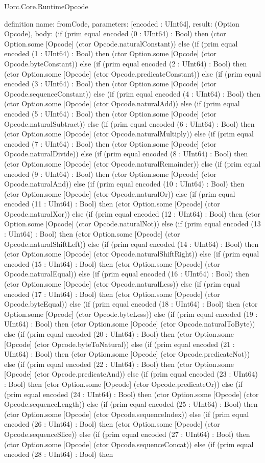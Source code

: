 \begin{lexlean}{Uorc.Core.RuntimeOpcode}
\begin{semanticmodule}
definition{
  name: fromCode,
  parameters: [encoded : UInt64],
  result: (Option Opcode),
  body: (if (prim equal encoded (0 : UInt64) : Bool) then (ctor Option.some [Opcode] (ctor Opcode.naturalConstant)) else (if (prim equal encoded (1 : UInt64) : Bool) then (ctor Option.some [Opcode] (ctor Opcode.byteConstant)) else (if (prim equal encoded (2 : UInt64) : Bool) then (ctor Option.some [Opcode] (ctor Opcode.predicateConstant)) else (if (prim equal encoded (3 : UInt64) : Bool) then (ctor Option.some [Opcode] (ctor Opcode.sequenceConstant)) else (if (prim equal encoded (4 : UInt64) : Bool) then (ctor Option.some [Opcode] (ctor Opcode.naturalAdd)) else (if (prim equal encoded (5 : UInt64) : Bool) then (ctor Option.some [Opcode] (ctor Opcode.naturalSubtract)) else (if (prim equal encoded (6 : UInt64) : Bool) then (ctor Option.some [Opcode] (ctor Opcode.naturalMultiply)) else (if (prim equal encoded (7 : UInt64) : Bool) then (ctor Option.some [Opcode] (ctor Opcode.naturalDivide)) else (if (prim equal encoded (8 : UInt64) : Bool) then (ctor Option.some [Opcode] (ctor Opcode.naturalRemainder)) else (if (prim equal encoded (9 : UInt64) : Bool) then (ctor Option.some [Opcode] (ctor Opcode.naturalAnd)) else (if (prim equal encoded (10 : UInt64) : Bool) then (ctor Option.some [Opcode] (ctor Opcode.naturalOr)) else (if (prim equal encoded (11 : UInt64) : Bool) then (ctor Option.some [Opcode] (ctor Opcode.naturalXor)) else (if (prim equal encoded (12 : UInt64) : Bool) then (ctor Option.some [Opcode] (ctor Opcode.naturalNot)) else (if (prim equal encoded (13 : UInt64) : Bool) then (ctor Option.some [Opcode] (ctor Opcode.naturalShiftLeft)) else (if (prim equal encoded (14 : UInt64) : Bool) then (ctor Option.some [Opcode] (ctor Opcode.naturalShiftRight)) else (if (prim equal encoded (15 : UInt64) : Bool) then (ctor Option.some [Opcode] (ctor Opcode.naturalEqual)) else (if (prim equal encoded (16 : UInt64) : Bool) then (ctor Option.some [Opcode] (ctor Opcode.naturalLess)) else (if (prim equal encoded (17 : UInt64) : Bool) then (ctor Option.some [Opcode] (ctor Opcode.byteEqual)) else (if (prim equal encoded (18 : UInt64) : Bool) then (ctor Option.some [Opcode] (ctor Opcode.byteLess)) else (if (prim equal encoded (19 : UInt64) : Bool) then (ctor Option.some [Opcode] (ctor Opcode.naturalToByte)) else (if (prim equal encoded (20 : UInt64) : Bool) then (ctor Option.some [Opcode] (ctor Opcode.byteToNatural)) else (if (prim equal encoded (21 : UInt64) : Bool) then (ctor Option.some [Opcode] (ctor Opcode.predicateNot)) else (if (prim equal encoded (22 : UInt64) : Bool) then (ctor Option.some [Opcode] (ctor Opcode.predicateAnd)) else (if (prim equal encoded (23 : UInt64) : Bool) then (ctor Option.some [Opcode] (ctor Opcode.predicateOr)) else (if (prim equal encoded (24 : UInt64) : Bool) then (ctor Option.some [Opcode] (ctor Opcode.sequenceLength)) else (if (prim equal encoded (25 : UInt64) : Bool) then (ctor Option.some [Opcode] (ctor Opcode.sequenceIndex)) else (if (prim equal encoded (26 : UInt64) : Bool) then (ctor Option.some [Opcode] (ctor Opcode.sequenceSlice)) else (if (prim equal encoded (27 : UInt64) : Bool) then (ctor Option.some [Opcode] (ctor Opcode.sequenceConcat)) else (if (prim equal encoded (28 : UInt64) : Bool) then }
\end{semanticmodule}
\end{lexlean}
